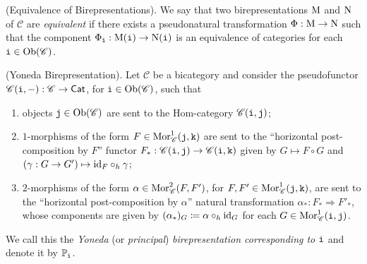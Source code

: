 
\noindent\begin{definition}\textup{(Equivalence of Birepresentations).} We say that two birepresentations $\textup{M}$ and $\textup{N}$ of $\mathscr{C}$ are {\em equivalent} if there exists a pseudonatural transformation $\Phi : \textup{M} \to \textup{N}$ such that the component $\Phi_{\textup{\texttt{i}}} : \textup{M}(\textup{\texttt{i}}) \to \textup{N}(\textup{\texttt{i}})$ is an equivalence of categories for each $\textup{\texttt{i}} \in \textup{Ob}(\mathscr{C})$.\\
\end{definition}

\noindent\begin{definition}\label{YonedaBirepresentation}\textup{(Yoneda Birepresentation)}. Let $\mathscr{C}$ be a bicategory and consider the pseudofunctor $\mathscr{C}(\textup{\texttt{i}}, -) : \mathscr{C} \to \textup{\textsf{Cat}}$, for $\textup{\texttt{i}} \in \textup{Ob}(\mathscr{C})$, such that
\begin{enumerate}[label=$\bullet$, leftmargin=4\parindent]
\item objects $\textup{\texttt{j}} \in \textup{Ob}(\mathscr{C})$ are sent to the Hom-category $\mathscr{C}(\textup{\texttt{i}}, \textup{\texttt{j}})$;
\item $1$-morphisms of the form $F \in \textup{Mor}_\mathscr{C}^1(\textup{\texttt{j}}, \textup{\texttt{k}})$ are sent to the ``horizontal post-composition by $F$'' functor $F_* : \mathscr{C}(\textup{\texttt{i}}, \textup{\texttt{j}}) \to \mathscr{C}(\textup{\texttt{i}}, \textup{\texttt{k}})$ given by $G \mapsto F \circ G$ and $(\gamma : G \to G') \mapsto \textup{id}_F \circ_h \gamma$;
\item $2$-morphisms of the form $\alpha \in \textup{Mor}_\mathscr{C}^2(F, F')$, for $F, F' \in \textup{Mor}_\mathscr{C}^1(\textup{\texttt{j}}, \textup{\texttt{k}})$, are sent to the ``horizontal post-composition by $\alpha$'' natural transformation $\alpha_* : F_* \Rightarrow F'_*$, whose components are given by $(\alpha_*)_G \coloneqq \alpha \circ_h \textup{id}_G$ for each $G \in \textup{Mor}_\mathscr{C}^1(\textup{\texttt{i}}, \textup{\texttt{j}})$. %
\end{enumerate}
\noindent We call this the {\em Yoneda} (or {\em principal}) {\em birepresentation corresponding to $\textup{\texttt{i}}$} and denote it by $\mathbb{P}_{\textup{\texttt{i}}}$.\\
\end{definition}

